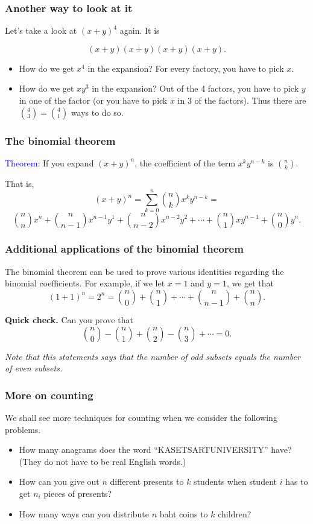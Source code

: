 \begin{frame}\frametitle{Another way to look at it}
  Let's take a look at $(x+y)^4$ again.  It is

  \[ (x+y)(x+y)(x+y)(x+y). \]

  \begin{itemize}
  \item How do we get $x^4$ in the expansion?  \pause For every
    factory, you have to pick $x$.
  \item How do we get $xy^3$ in the expansion? \pause Out of the 4
    factors, you have to pick $y$ in one of the factor (or you have to
    pick $x$ in 3 of the factors).  \pause Thus there are
    $\binom{4}{3}=\binom{4}{1}$ ways to do so.
  \end{itemize}
\end{frame}

\begin{frame}\frametitle{The binomial theorem}
  \begin{tcolorbox}
    \textcolor{blue}{Theorem:} If you expand $(x+y)^n$, the
    coefficient of the term $x^ky^{n-k}$ is $\binom{n}{k}$.
  \end{tcolorbox}
  That is,
  \[ (x+y)^n = \sum_{k=0}^n \binom{n}{k} x^ky^{n-k} = \]
  \[ \binom{n}{n} x^n + \binom{n}{n-1} x^{n-1}y^1 + \binom{n}{n-2} x^{n-2}y^2 + \cdots + \binom{n}{1}xy^{n-1} + \binom{n}{0} y^n.\]
\end{frame}

\begin{frame}\frametitle{Additional applications of the binomial theorem}
  The binomial theorem can be used to prove various identities
  regarding the binomial coefficients.  For example, if we let $x=1$
  and $y=1$, we get that
  \[(1+1)^n=2^n=\binom{n}{0}+\binom{n}{1}+\cdots+\binom{n}{n-1}+\binom{n}{n}.\]

  \pause

  \vspace{0.2in}

  \begin{tcolorbox}
    {\bf Quick check.}  Can you prove that
    \[\binom{n}{0} - \binom{n}{1} + \binom{n}{2} - \binom{n}{3} + \cdots = 0.\]

    {\em Note that this statements says that the number of odd subsets
      equals the number of even subsets.}
  \end{tcolorbox}
\end{frame}

\begin{frame}\frametitle{More on counting}
  We shall see more techniques for counting when we consider the
  following problems.
  \begin{itemize}
  \item How many anagrams does the word ``KASETSARTUNIVERSITY'' have?
    (They do not have to be real English words.)
  \item How can you give out $n$ different presents to $k$ students
    when student $i$ has to get $n_i$ pieces of presents?
  \item How many ways can you distribute $n$ baht coins to $k$
    children?
  \end{itemize}
\end{frame}

